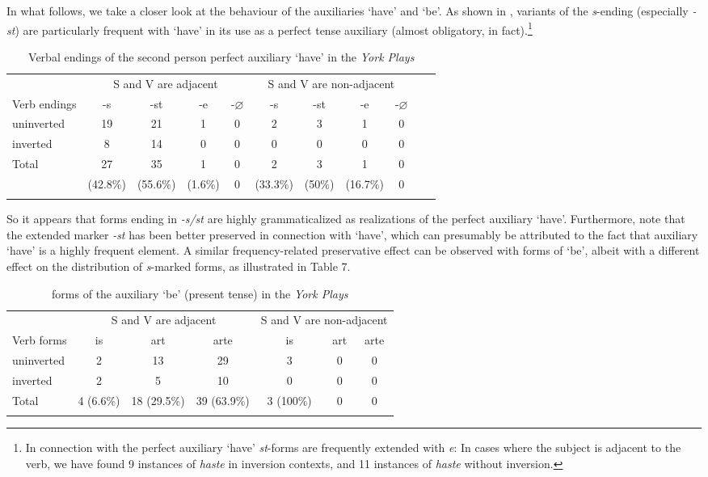 \documentclass[output=paper]{langsci/langscibook}
\begin{document}
In what follows, we take a closer look at the behaviour of the auxiliaries
`have' and `be'. As shown in , variants of the
\emph{s}-ending (especially \emph{-st}) are particularly frequent with `have’
in its use as a perfect tense auxiliary (almost obligatory, in
fact).\footnote{In connection with the perfect auxiliary ‘have'
    \Ssg{} \emph{st}-forms are frequently extended with \emph{e}: In cases
    where the subject is adjacent to the verb, we have found 9 instances of
\emph{haste} in inversion contexts, and 11 instances of \emph{haste} without
inversion.}

\begin{table}
  \begin{tabular}{lcccccccccc}
  \lsptoprule
& \multicolumn{4}{c}{S and V are adjacent} & \multicolumn{4}{c}{S and V are non-adjacent}\\\cmidrule(lr){2-5}\cmidrule(lr){6-9}
Verb endings  & -s & -st & -e & -$\varnothing$ & -s & -st & -e & -$\varnothing$\\
uninverted & 19 & 21 & 1 & 0 & 2 & 3 & 1 & 0\\
inverted & 8 & 14 & 0 & 0  & 0 & 0 & 0 &  0\\\midrule
Total & 27  & 35  & 1  & 0 & 2  & 3  & 1  & 0\\
 & (42.8\%) &  (55.6\%) & (1.6\%) & 0 &  (33.3\%) & (50\%) & (16.7\%) & 0\\
  \lspbottomrule
  \end{tabular}
\caption{Verbal endings of the second person perfect auxiliary `have' in the \emph{York Plays}\label{table1-2ndps-have}}
\end{table}

So it appears that forms ending in \emph{-s/st} are highly grammaticalized as
realizations of the \Ssg{} perfect auxiliary `have'. Furthermore, note that the
extended \Ssg{} marker \emph{-st} has been better preserved in connection
with `have', which can presumably be attributed to the fact that auxiliary
`have' is a highly frequent element. A similar frequency-related preservative
effect can be observed with \Ssg{} forms of `be', albeit with a different
effect on the distribution of \emph{s}-marked forms, as illustrated in Table
7.

\begin{table}
  \begin{tabular}{lcccccc}
  \lsptoprule
& \multicolumn{3}{c}{S and V are adjacent} & \multicolumn{3}{c}{S and V are non-adjacent}\\\cmidrule(lr){2-4}\cmidrule(lr){5-7}
Verb forms  & is & art & arte & is & art & arte\\
uninverted & 2 & 13 & 29 & 3 & 0 & 0\\
inverted & 2 & 5 & 10 & 0  & 0 & 0\\\midrule
Total & 4 (6.6\%) & 18 (29.5\%) & 39 (63.9\%) & 3 (100\%) & 0 & 0\\
  \lspbottomrule
  \end{tabular}
\caption{\Ssg{} forms of the auxiliary `be' (present tense) in the \emph{York
Plays}\label{table1-2ndps-be}}
\end{table}
\end{document}

